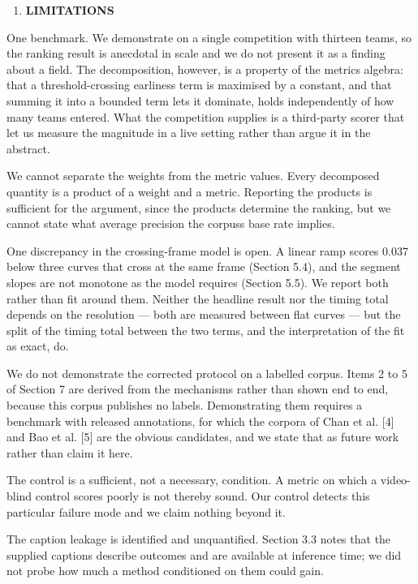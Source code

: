 \begin{enumerate}
\def\labelenumi{\arabic{enumi}.}
\setcounter{enumi}{6}
\item
  \textbf{LIMITATIONS}
\end{enumerate}

One benchmark. We demonstrate on a single competition with thirteen teams, so the ranking result is anecdotal in scale and we do not present it as a finding about a field. The decomposition, however, is a property of the metric\textquotesingle s algebra: that a threshold-crossing earliness term is maximised by a constant, and that summing it into a bounded term lets it dominate, holds independently of how many teams entered. What the competition supplies is a third-party scorer that let us measure the magnitude in a live setting rather than argue it in the abstract.

We cannot separate the weights from the metric values. Every decomposed quantity is a product of a weight and a metric. Reporting the products is sufficient for the argument, since the products determine the ranking, but we cannot state what average precision the corpus\textquotesingle s base rate implies.

One discrepancy in the crossing-frame model is open. A linear ramp scores 0.037 below three curves that cross at the same frame (Section 5.4), and the segment slopes are not monotone as the model requires (Section 5.5). We report both rather than fit around them. Neither the headline result nor the timing total depends on the resolution --- both are measured between flat curves --- but the split of the timing total between the two terms, and the interpretation of the fit as exact, do.

We do not demonstrate the corrected protocol on a labelled corpus. Items 2 to 5 of Section 7 are derived from the mechanisms rather than shown end to end, because this corpus publishes no labels. Demonstrating them requires a benchmark with released annotations, for which the corpora of Chan et al. {[}4{]} and Bao et al. {[}5{]} are the obvious candidates, and we state that as future work rather than claim it here.

The control is a sufficient, not a necessary, condition. A metric on which a video-blind control scores poorly is not thereby sound. Our control detects this particular failure mode and we claim nothing beyond it.

The caption leakage is identified and unquantified. Section 3.3 notes that the supplied captions describe outcomes and are available at inference time; we did not probe how much a method conditioned on them could gain.

